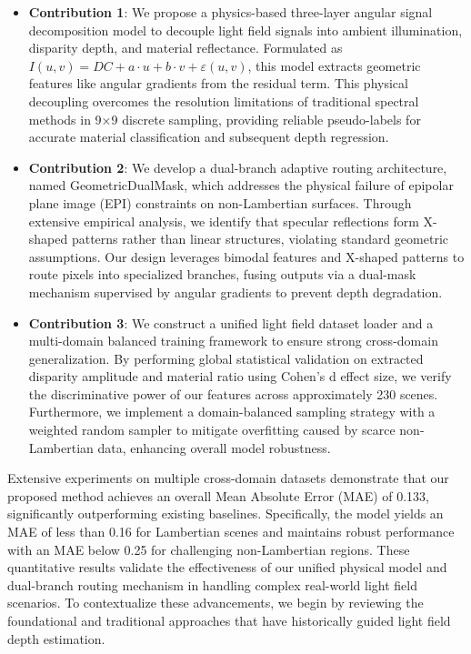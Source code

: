 \documentclass[lettersize,journal]{IEEEtran}
\begin{document}
\begin{itemize}
  \item \textbf{Contribution 1}: We propose a physics-based three-layer angular signal decomposition model to decouple light field signals into ambient illumination, disparity depth, and material reflectance. Formulated as $I(u,v) = DC + a \cdot u + b \cdot v + \varepsilon(u,v)$, this model extracts geometric features like angular gradients from the residual term. This physical decoupling overcomes the resolution limitations of traditional spectral methods in 9×9 discrete sampling, providing reliable pseudo-labels for accurate material classification and subsequent depth regression.
  \item \textbf{Contribution 2}: We develop a dual-branch adaptive routing architecture, named GeometricDualMask, which addresses the physical failure of epipolar plane image (EPI) constraints on non-Lambertian surfaces. Through extensive empirical analysis, we identify that specular reflections form X-shaped patterns rather than linear structures, violating standard geometric assumptions. Our design leverages bimodal features and X-shaped patterns to route pixels into specialized branches, fusing outputs via a dual-mask mechanism supervised by angular gradients to prevent depth degradation.
  \item \textbf{Contribution 3}: We construct a unified light field dataset loader and a multi-domain balanced training framework to ensure strong cross-domain generalization. By performing global statistical validation on extracted disparity amplitude and material ratio using Cohen's d effect size, we verify the discriminative power of our features across approximately 230 scenes. Furthermore, we implement a domain-balanced sampling strategy with a weighted random sampler to mitigate overfitting caused by scarce non-Lambertian data, enhancing overall model robustness.
\end{itemize}
Extensive experiments on multiple cross-domain datasets demonstrate that our proposed method achieves an overall Mean Absolute Error (MAE) of 0.133, significantly outperforming existing baselines. Specifically, the model yields an MAE of less than 0.16 for Lambertian scenes and maintains robust performance with an MAE below 0.25 for challenging non-Lambertian regions. These quantitative results validate the effectiveness of our unified physical model and dual-branch routing mechanism in handling complex real-world light field scenarios. To contextualize these advancements, we begin by reviewing the foundational and traditional approaches that have historically guided light field depth estimation.
\end{document}
